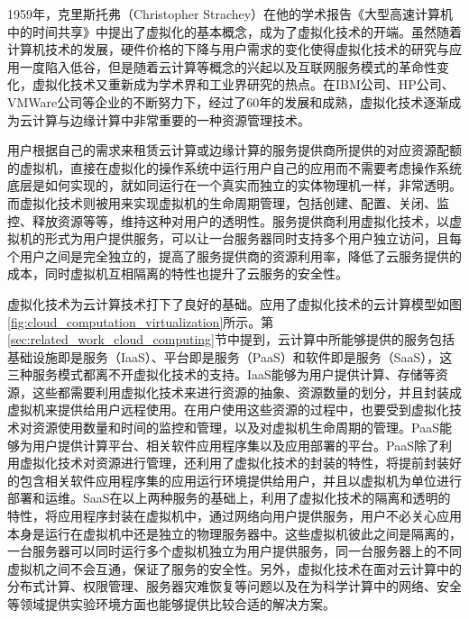 1959年，克里斯托弗（Christopher Strachey）在他的学术报告《大型高速计算机中的时间共享》中提出了虚拟化的基本概念，成为了虚拟化技术的开端\citep{本刊编辑部2017虚拟化概述}。虽然随着计算机技术的发展，硬件价格的下降与用户需求的变化使得虚拟化技术的研究与应用一度陷入低谷，但是随着云计算等概念的兴起以及互联网服务模式的革命性变化，虚拟化技术又重新成为学术界和工业界研究的热点\cite{menasce2005virtualization}。在IBM公司、HP公司、VMWare公司等企业的不断努力下，经过了60年的发展和成熟，虚拟化技术逐渐成为云计算与边缘计算中非常重要的一种资源管理技术\cite{pearce2013virtualization,kumar2014review}。

用户根据自己的需求来租赁云计算或边缘计算的服务提供商所提供的对应资源配额的虚拟机，直接在虚拟化的操作系统中运行用户自己的应用而不需要考虑操作系统底层是如何实现的，就如同运行在一个真实而独立的实体物理机一样，非常透明\cite{叶蔚2019基于虚拟化的}。而虚拟化技术则被用来实现虚拟机的生命周期管理，包括创建、配置、关闭、监控、释放资源等等，维持这种对用户的透明性。服务提供商利用虚拟化技术，以虚拟机的形式为用户提供服务，可以让一台服务器同时支持多个用户独立访问，且每个用户之间是完全独立的，提高了服务提供商的资源利用率，降低了云服务提供的成本，同时虚拟机互相隔离的特性也提升了云服务的安全性。

虚拟化技术为云计算技术打下了良好的基础。应用了虚拟化技术的云计算模型如图\ref{fig:cloud_computation_virtualization}所示\citep{陈思锦2015云计算中的虚拟化技术与虚拟化安全}。第\ref{sec:related_work_cloud_computing}节中提到，云计算中所能够提供的服务包括基础设施即是服务（IaaS）、平台即是服务（PaaS）和软件即是服务（SaaS），这三种服务模式都离不开虚拟化技术的支持。IaaS能够为用户提供计算、存储等资源，这些都需要利用虚拟化技术来进行资源的抽象、资源数量的划分，并且封装成虚拟机来提供给用户远程使用。在用户使用这些资源的过程中，也要受到虚拟化技术对资源使用数量和时间的监控和管理，以及对虚拟机生命周期的管理。PaaS能够为用户提供计算平台、相关软件应用程序集以及应用部署的平台。PaaS除了利用虚拟化技术对资源进行管理，还利用了虚拟化技术的封装的特性，将提前封装好的包含相关软件应用程序集的应用运行环境提供给用户，并且以虚拟机为单位进行部署和运维。SaaS在以上两种服务的基础上，利用了虚拟化技术的隔离和透明的特性，将应用程序封装在虚拟机中，通过网络向用户提供服务，用户不必关心应用本身是运行在虚拟机中还是独立的物理服务器中。这些虚拟机彼此之间是隔离的，一台服务器可以同时运行多个虚拟机独立为用户提供服务，同一台服务器上的不同虚拟机之间不会互通，保证了服务的安全性。另外，虚拟化技术在面对云计算中的分布式计算、权限管理、服务器灾难恢复等问题以及在为科学计算中的网络、安全等领域提供实验环境方面也能够提供比较合适的解决方案\cite{2008半虚拟化技术分析与研究}。


